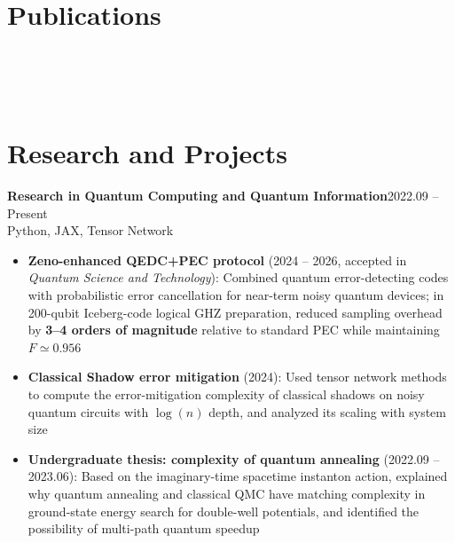 \documentclass[10pt, a4paper]{article}
\newcommand{\entry}[2]{%
    \vspace{0.1em}
    \noindent\textbf{#1}\hfill{\small\color{graytext}#2}\\[-0.4em]
}
\newcommand{\entrysub}[2]{%
    \noindent{\small #1}\hfill{\small\color{graytext}#2}\\[-0.5em]
}
\begin{document}
\section{Publications}
\\[-0.2em]
\\[0.2em]
\\[-0.2em]

\section{Research and Projects}

\entry{Research in Quantum Computing and Quantum Information}{2022.09 -- Present}
\entrysub{Department of Physics, Tsinghua University}{Python, JAX, Tensor Network}
\begin{itemize}
    \item \textbf{Zeno-enhanced QEDC+PEC protocol} (2024 -- 2026, accepted in \textit{Quantum Science and Technology}): Combined quantum error-detecting codes with probabilistic error cancellation for near-term noisy quantum devices; in 200-qubit Iceberg-code logical GHZ preparation, reduced sampling overhead by \textbf{3--4 orders of magnitude} relative to standard PEC while maintaining $F\simeq0.956$
    \item \textbf{Classical Shadow error mitigation} (2024): Used tensor network methods to compute the error-mitigation complexity of classical shadows on noisy quantum circuits with $\log(n)$ depth, and analyzed its scaling with system size
    \item \textbf{Undergraduate thesis: complexity of quantum annealing} (2022.09 -- 2023.06): Based on the imaginary-time spacetime instanton action, explained why quantum annealing and classical QMC have matching complexity in ground-state energy search for double-well potentials, and identified the possibility of multi-path quantum speedup
\end{itemize}
\end{document}
